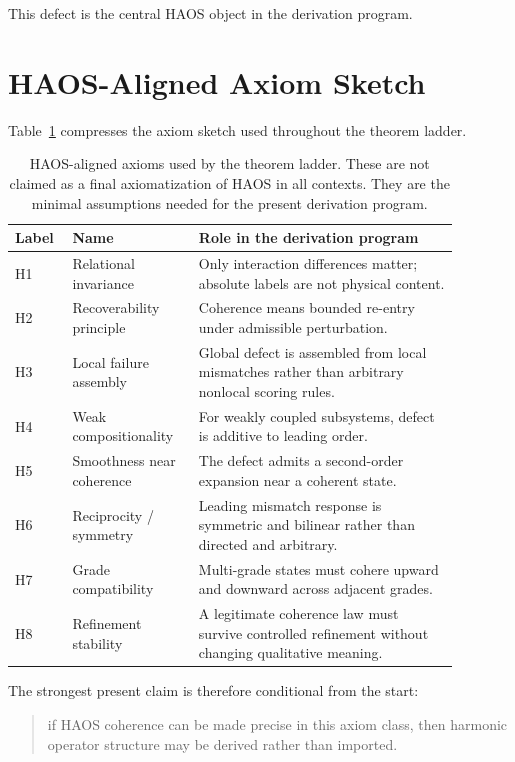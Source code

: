 \documentclass[11pt]{article}
\begin{document}
This defect is the central HAOS object in the derivation program.

\section{HAOS-Aligned Axiom Sketch}

Table~\ref{tab:axioms} compresses the axiom sketch used throughout the theorem ladder.

\begin{table}[t]
\centering
\small
\begin{tabular}{p{0.10\linewidth}p{0.25\linewidth}p{0.53\linewidth}}
\toprule
Label & Name & Role in the derivation program \\
\midrule
H1 & Relational invariance & Only interaction differences matter; absolute labels are not physical content. \\
H2 & Recoverability principle & Coherence means bounded re-entry under admissible perturbation. \\
H3 & Local failure assembly & Global defect is assembled from local mismatches rather than arbitrary nonlocal scoring rules. \\
H4 & Weak compositionality & For weakly coupled subsystems, defect is additive to leading order. \\
H5 & Smoothness near coherence & The defect admits a second-order expansion near a coherent state. \\
H6 & Reciprocity / symmetry & Leading mismatch response is symmetric and bilinear rather than directed and arbitrary. \\
H7 & Grade compatibility & Multi-grade states must cohere upward and downward across adjacent grades. \\
H8 & Refinement stability & A legitimate coherence law must survive controlled refinement without changing qualitative meaning. \\
\bottomrule
\end{tabular}
\caption{HAOS-aligned axioms used by the theorem ladder. These are not claimed as a final axiomatization of HAOS in all contexts. They are the minimal assumptions needed for the present derivation program.}
\label{tab:axioms}
\end{table}

The strongest present claim is therefore conditional from the start:
\begin{quote}
if HAOS coherence can be made precise in this axiom class, then harmonic operator structure may be derived rather than imported.
\end{quote}
\end{document}
